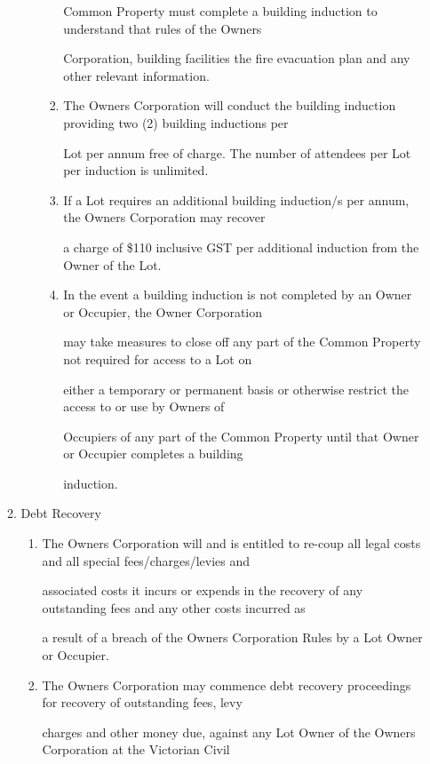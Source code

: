 \documentclass{article}
\begin{document}
\begin{enumerate}[label=\arabic*.]
\begin{enumerate}[label=\arabic{enumi}.\arabic*.]
\begin{enumerate}[label=(\arabic*)]
\begin{enumerate}[label=(\alph*)]
Common Property must complete a building induction to understand that rules of the Owners 

Corporation, building facilities the fire evacuation plan and any other relevant information. 

\item  The Owners Corporation will conduct the building induction providing two (2) building inductions per 

Lot per annum free of charge. The number of attendees per Lot per induction is unlimited. 

\item  If a Lot requires an additional building induction/s per annum, the Owners Corporation may recover 

a charge of \$110 inclusive GST per additional induction from the Owner of the Lot. 

\item  In the event a building induction is not completed by an Owner or Occupier, the Owner Corporation 

may take measures to close off any part of the Common Property not required for access to a Lot on 

either a temporary or permanent basis or otherwise restrict the access to or use by Owners of 

Occupiers of any part of the Common Property until that Owner or Occupier completes a building 

induction. 

\end{enumerate}
\end{enumerate}
\item  Debt Recovery 

\begin{enumerate}[label=(\arabic*)]
\item  The Owners Corporation will and is entitled to re-coup all legal costs and all special fees/charges/levies and 

associated costs it incurs or expends in the recovery of any outstanding fees and any other costs incurred as 

a result of a breach of the Owners Corporation Rules by a Lot Owner or Occupier. 

\item  The Owners Corporation may commence debt recovery proceedings for recovery of outstanding fees, levy 

charges and other money due, against any Lot Owner of the Owners Corporation at the Victorian Civil 


\end{enumerate}
\end{enumerate}
\end{enumerate}
\end{document}
